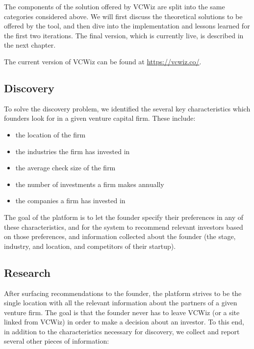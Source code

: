The components of the solution offered by VCWiz are split into the same categories considered above. We will first discuss the theoretical solutions to be offered by the tool, and then dive into the implementation and lessons learned for the first two iterations. The final version, which is currently live, is described in the next chapter.

The current version of VCWiz can be found at \url{https://vcwiz.co/}.

\subsection{Discovery}

To solve the discovery problem, we identified the several key characteristics which founders look for in a given venture capital firm. These include:

\begin{itemize}
  \item the location of the firm
  \item the industries the firm has invested in
  \item the average check size of the firm
  \item the number of investments a firm makes annually
  \item the companies a firm has invested in
\end{itemize}

The goal of the platform is to let the founder specify their preferences in any of these characteristics, and for the system to recommend relevant investors based on those preferences, and information collected about the founder (the stage, industry, and location, and competitors of their startup).

\subsection{Research}

After surfacing recommendations to the founder, the platform strives to be the single location with all the relevant information about the partners of a given venture firm. The goal is that the founder never has to leave VCWiz (or a site linked from VCWiz) in order to make a decision about an investor. To this end, in addition to the characteristics necessary for discovery, we collect and report several other pieces of information:


